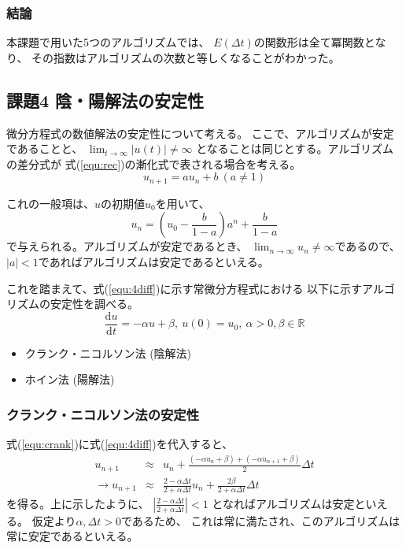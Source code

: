 \documentclass[a4j, titlepage]{jsarticle}
\numberwithin{equation}{section}
\begin{document}
        \subsubsection{結論}
            本課題で用いた5つのアルゴリズムでは、
            $E(\Delta t)$の関数形は全て冪関数となり、
            その指数はアルゴリズムの次数と等しくなることがわかった。

    \subsection{課題4 陰・陽解法の安定性}
        微分方程式の数値解法の安定性について考える。
        ここで、アルゴリズムが安定であることと、
        $\displaystyle\lim_{t\to\infty}|u(t)|\neq\infty$
        となることは同じとする。アルゴリズムの差分式が
        式(\ref{equ:rec})の漸化式で表される場合を考える。
        \begin{equation}
            u_{n+1} = au_n+b \ (a\neq 1) \label{equ:rec}
        \end{equation}
        
        これの一般項は、$u$の初期値$u_0$を用いて、
        \begin{equation}
            u_n = \left(u_0-\frac{b}{1-a}\right)a^n+\frac{b}{1-a}
        \end{equation}
        で与えられる\cite{2rec}。アルゴリズムが安定であるとき、
        $\displaystyle\lim_{n\to\infty}u_n\neq\infty$であるので、
        $|a|<1$であればアルゴリズムは安定であるといえる。

        これを踏まえて、式(\ref{equ:4diff})に示す常微分方程式における
        以下に示すアルゴリズムの安定性を調べる。
        \begin{equation}
            \frac{\mathrm{d}u}{\mathrm{d}t} = -\alpha u + \beta, \ u(0) = u_0, \ \alpha > 0, \beta \in \mathbb{R} \label{equ:4diff}
        \end{equation}
        \begin{itemize}
            \item クランク・ニコルソン法 (陰解法)
            \item ホイン法 (陽解法)
        \end{itemize}

        \subsubsection{クランク・ニコルソン法の安定性} \label{sec:4crank}
            式(\ref{equ:crank})に式(\ref{equ:4diff})を代入すると、
            \begin{eqnarray*}
                u_{n + 1} &\approx& u_n + \frac{(-\alpha u_n + \beta) + (-\alpha u_{n + 1} + \beta)}{2}\Delta t \\
                \rightarrow u_{n + 1} &\approx& \frac{2 - \alpha\Delta t}{2 + \alpha\Delta t}u_n + \frac{2\beta}{2 + \alpha\Delta t}\Delta t
            \end{eqnarray*}
            を得る。上に示したように、
            $\displaystyle\left|\frac{2 - \alpha\Delta t}{2 + \alpha\Delta t}\right| < 1$
            となればアルゴリズムは安定といえる。
            仮定より$\alpha, \Delta t > 0$であるため、
            これは常に満たされ、このアルゴリズムは常に安定であるといえる。
\end{document}
